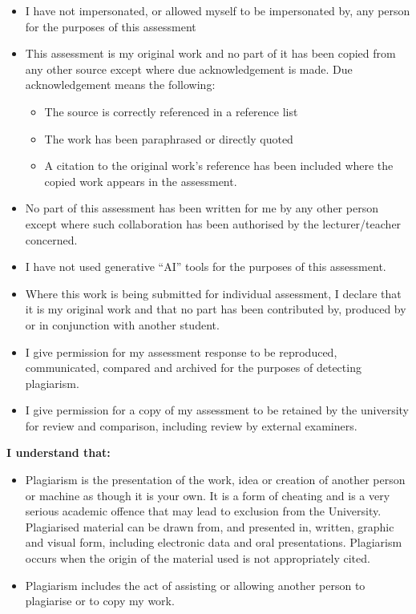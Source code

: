 \documentclass[
]{article}
\providecommand{\tightlist}{%
  \setlength{\itemsep}{0pt}\setlength{\parskip}{0pt}}
\begin{document}
\begin{itemize}
\item
  I have not impersonated, or allowed myself to be impersonated by, any
  person for the purposes of this assessment
\item
  This assessment is my original work and no part of it has been copied
  from any other source except where due acknowledgement is made. Due
  acknowledgement means the following:

  \begin{itemize}
  \tightlist
  \item
    The source is correctly referenced in a reference list
  \item
    The work has been paraphrased or directly quoted
  \item
    A citation to the original work's reference has been included where
    the copied work appears in the assessment.
  \end{itemize}
\item
  No part of this assessment has been written for me by any other person
  except where such collaboration has been authorised by the
  lecturer/teacher concerned.
\item
  I have not used generative ``AI'' tools for the purposes of this
  assessment.
\item
  Where this work is being submitted for individual assessment, I
  declare that it is my original work and that no part has been
  contributed by, produced by or in conjunction with another student.
\item
  I give permission for my assessment response to be reproduced,
  communicated, compared and archived for the purposes of detecting
  plagiarism.
\item
  I give permission for a copy of my assessment to be retained by the
  university for review and comparison, including review by external
  examiners.
\end{itemize}

\textbf{I understand that:}

\begin{itemize}
\item
  Plagiarism is the presentation of the work, idea or creation of
  another person or machine as though it is your own. It is a form of
  cheating and is a very serious academic offence that may lead to
  exclusion from the University. Plagiarised material can be drawn from,
  and presented in, written, graphic and visual form, including
  electronic data and oral presentations. Plagiarism occurs when the
  origin of the material used is not appropriately cited.
\item
  Plagiarism includes the act of assisting or allowing another person to
  plagiarise or to copy my work.
\end{itemize}
\end{document}
